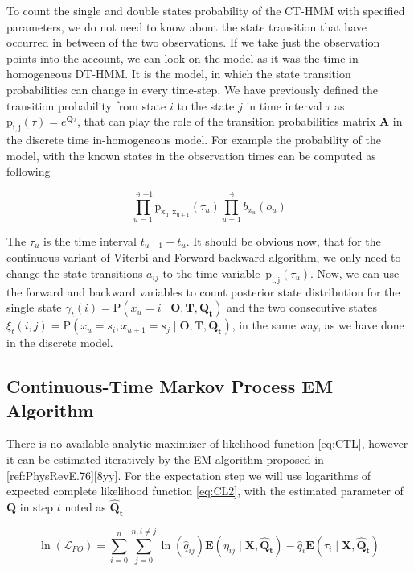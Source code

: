 \documentclass[thesis=M,english]{FITthesis}[2012/10/20]
\newcommand{\matr}[1]{\mathbf{#1}}
\begin{document}
To count the single and double states probability of the CT-HMM with specified parameters, we do not need to know about the state transition that have occurred in between of the two observations.
If we take just the observation points into the account, we can look on the model as it was the time in-homogeneous DT-HMM. It is the model, in which the state transition probabilities can change in every time-step. We have previously defined the transition probability from state $i$ to the state $j$ in time interval $\tau$ as $\mathrm{p_{i,j}}( \tau ) = e^{ \matr{Q} \tau}$, that can play the role of the transition probabilities matrix $\matr{A}$ in the discrete time in-homogeneous model. For example the probability of the model, with the known states in the observation times can be computed as following

\begin{equation}
\prod_{u=1}^{\ni-1} \mathrm{p_{x_u, x_{u+1}}} (\tau_u) \prod_{u=1}^{\ni} b_{ x_u }(o_u)
\end{equation}

The $\tau_u$ is the time interval $t_{u+1} - t_u$. It should be obvious now, that for the continuous variant of Viterbi and Forward-backward algorithm, we only need to change the state transitions $a_{ij}$ to the time variable~$\mathrm{p_{i,j}}( \tau_u )$.   
Now, we can use the forward and backward variables to count posterior state distribution for the single state  $\gamma_t(i) = \mathrm{P}( x_u = i \mid \matr{O},\matr{T}, \matr{ Q_t } )$ and the two consecutive states $\xi_t(i,j) = \mathrm{P}( x_u = s_i, x_{u+1} = s_j \mid \matr{O},\matr{T}, \matr{ Q_t } )$, in the same way,  as we have done in the discrete model.


\subsection{Continuous-Time Markov Process EM Algorithm} 

There is no available analytic maximizer of likelihood function \eqref{eq:CTL}, however it can be estimated iteratively by the EM algorithm proposed in [ref:PhysRevE.76][8yy].  
For the expectation step we will use logarithms of expected complete likelihood function \eqref{eq:CL2}, with the estimated parameter of $\matr{Q}$ in step $t$ noted as $\matr{ \hat Q_t } $.

\begin{equation}\label{eq:EMCL}
 \ln( \mathcal{L}_{FO} ) = \sum_{i=0}^n \sum_{j=0}^{n, i \neq j} \ln( \hat q_{ij}) \mathbf{E}( \eta_{ij} \mid \matr{X}, \matr{ \hat Q_t } ) - \hat q_i \mathbf{E}( \tau_i \mid \matr{X}, \matr{ \hat Q_t } )
\end{equation}
\end{document}
